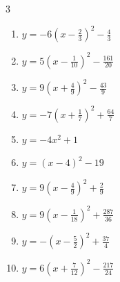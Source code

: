 \begin{multicols}{3}
\begin{enumerate}

  \item $\displaystyle y=-6\left( x-\frac{2}{3}\right)^{2}-\frac{4}{3}$


  \item $\displaystyle y=5\left( x-\frac{1}{10}\right)^{2}-\frac{161}{20}$


  \item $\displaystyle y=9\left( x+\frac{4}{9}\right)^{2}-\frac{43}{9}$


  \item $\displaystyle y=-7\left( x+\frac{1}{7}\right)^{2}+\frac{64}{7}$


\columnbreak %

  \item $\displaystyle y=-4x^{2}+1$

        \phantom{$\displaystyle 頂点\left( 0 , 1 \right)$}

  \item $\displaystyle y=\left( x-4\right)^{2}-19$

        \phantom{$\displaystyle 頂点\left( 4 , -19 \right)$}

  \item $\displaystyle y=9\left( x-\frac{4}{9}\right)^{2}+\frac{2}{9}$


  \item $\displaystyle y=9\left( x-\frac{1}{18}\right)^{2}+\frac{287}{36}$


  \item $\displaystyle y=-\left( x-\frac{5}{2}\right)^{2}+\frac{37}{4}$


  \item $\displaystyle y=6\left( x+\frac{7}{12}\right)^{2}-\frac{217}{24}$


\end{enumerate}
\end{multicols}
